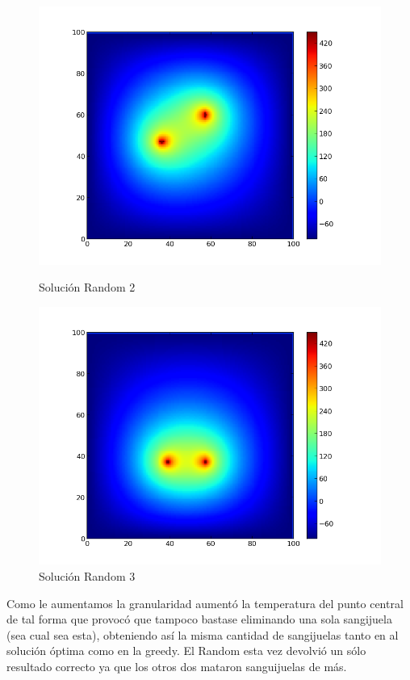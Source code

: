 \clearpage
\begin{figure}[htb]
\begin{center}
\includegraphics[scale=0.40]{imagenes/test6_g08_random_2.png} 
\caption{Solución Random 2} 

        \end{center}
\endminipage\hfill
{}
\begin{center}
\includegraphics[scale=0.40]{imagenes/test6_g08_random_3.png} 
\caption{Solución Random 3} 
        \end{center}
\endminipage\hfill 
\end{figure}

Como le aumentamos la granularidad aumentó la temperatura del punto central de tal forma que provocó que tampoco bastase eliminando una sola sangijuela (sea cual sea esta), obteniendo así la misma cantidad de sangijuelas tanto en al solución óptima como en la greedy. El Random esta vez devolvió un sólo resultado correcto ya que los otros dos mataron sanguijuelas de más.

